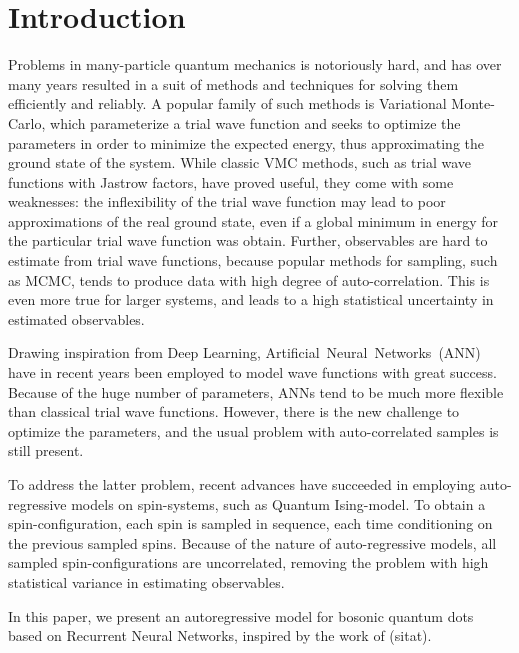 \section{Introduction}

Problems in many-particle quantum mechanics is notoriously hard, and has over
many years resulted in a suit of methods and techniques for solving them
efficiently and reliably. A popular family of such methods is Variational
Monte-Carlo, which parameterize a trial wave function and seeks to optimize the
parameters in order to minimize the expected energy, thus approximating the
ground state of the system. While classic VMC methods, such as trial wave
functions with Jastrow factors, have proved useful, they come with some
weaknesses: the inflexibility of the trial wave function may lead to poor
approximations of the real ground state, even if a global minimum in energy for
the particular trial wave function was obtain. Further, observables are hard to
estimate from trial wave functions, because popular methods for sampling, such
as MCMC, tends to produce data with high degree of auto-correlation\cite{Blocking}. This
is even more true for larger systems, and leads to a high statistical
uncertainty in estimated observables. 

Drawing inspiration from Deep Learning, Artificial~Neural~Networks~(ANN) have in recent years been employed to model wave functions with great success\cite{pfau2019abinitio}.
Because of the huge number of parameters, ANNs tend to be
much more flexible than classical trial wave functions. However, there is the
new challenge to optimize the parameters, and the usual problem with
auto-correlated samples is still present. 

To address the latter problem, recent advances\cite{hibatallah2020recurrent,Sharir_2020} have  succeeded in
employing auto-regressive models on spin-systems, such as Quantum Ising-model.
To obtain a spin-configuration, each spin is sampled in sequence, each time
conditioning on the previous sampled spins. Because of the nature of
auto-regressive models, all sampled spin-configurations are uncorrelated,
removing the problem with high statistical variance in estimating observables. 

In this paper, we present an autoregressive model for bosonic quantum dots based
on Recurrent Neural Networks, inspired by the work of (sitat). 

